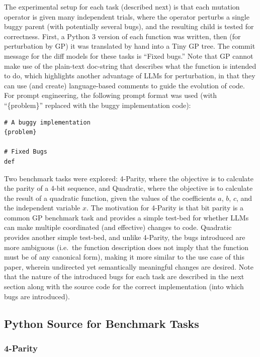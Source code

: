 \documentclass{article}
\begin{document}
The experimental setup for each task (described next) is that each mutation operator is given many independent trials, where the operator perturbs a single buggy parent (with potentially several bugs), and the resulting child is tested for correctness. First, a Python 3 version of each function was written, then (for perturbation by GP) it was translated by hand into a Tiny GP tree. The commit message for the diff models for these tasks is ``Fixed bugs.'' Note that GP cannot make use of the plain-text doc-string that describes what the function is intended to do, which highlights another advantage of LLMs for perturbation, in that they can use (and create) language-based comments to guide the evolution of code. For prompt engineering, the following prompt format was used (with ``\{problem\}'' replaced with the buggy implementation code):

\begin{verbatim}
# A buggy implementation
{problem}

# Fixed Bugs
def 
\end{verbatim}

Two benchmark tasks were explored: 4-Parity, where the objective is to calculate the parity of a 4-bit sequence, and Quadratic, where the objective is to calculate the result of a quadratic function, given the values of the coefficients $a$, $b$, $c$, and the independent variable $x$. The motivation for 4-Parity is that bit parity is a 
common GP benchmark task \cite{koza:book92} and provides a simple test-bed for whether LLMs can make multiple coordinated (and effective) changes to code. Quadratic provides another simple test-bed, and unlike 4-Parity, the bugs introduced are more ambiguous (i.e.\ the function description does not imply that the function must be of any canonical form), making it more similar to the use case of this paper, wherein undirected yet semantically meaningful changes are desired. Note that the nature of the introduced bugs for each task are described in the next section along with the source code for the correct implementation (into which bugs are introduced).

\subsection{Python Source for Benchmark Tasks}

\subsubsection{4-Parity}
\end{document}
